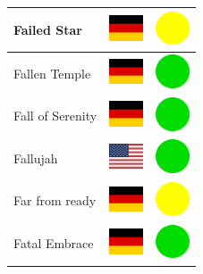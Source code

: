 \documentclass[12pt, a4paper, twoside]{report}
\begin{document}
\begin{center}
\begin{longtable}{|p{5cm}|p{2cm}|p{2cm}|}
 Failed Star                                                & \includegraphics[width=1cm]{../img/flags/de} &   \includegraphics[width=1cm]{../likes/m} \\ \hline
 Fallen Temple                                              & \includegraphics[width=1cm]{../img/flags/de} &   \includegraphics[width=1cm]{../likes/y} \\ \hline
 Fall of Serenity                                           & \includegraphics[width=1cm]{../img/flags/de} &   \includegraphics[width=1cm]{../likes/y} \\ \hline
 Fallujah                                                   & \includegraphics[width=1cm]{../img/flags/us} &   \includegraphics[width=1cm]{../likes/y} \\ \hline
 Far from ready                                             & \includegraphics[width=1cm]{../img/flags/de} &   \includegraphics[width=1cm]{../likes/m} \\ \hline
 Fatal Embrace                                              & \includegraphics[width=1cm]{../img/flags/de} &   \includegraphics[width=1cm]{../likes/y} \\ \hline

\end{longtable}
\end{center}
\end{document}
